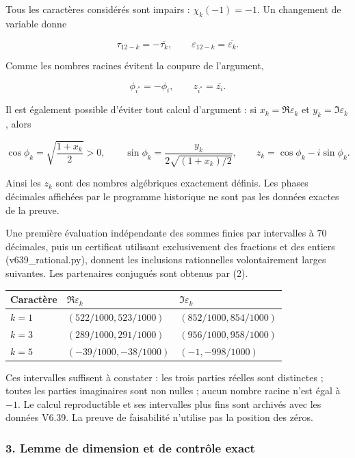 \documentclass[
  10pt,
  a4paper,
]{article}
\begin{document}
Tous les caractères considérés sont impairs : \(\chi_k(-1)=-1\). Un
changement de variable donne

\[
\tau_{12-k}=-\overline{\tau_k},\qquad
\varepsilon_{12-k}=\overline{\varepsilon_k}.
\]

Comme les nombres racines évitent la coupure de l'argument,

\[
\phi_{i^*}=-\phi_i,\qquad z_{i^*}=\overline{z_i}. \tag{2}
\]

Il est également possible d'éviter tout calcul d'argument : si
\(x_k=\Re\varepsilon_k\) et \(y_k=\Im\varepsilon_k\), alors

\[
\cos\phi_k=\sqrt{\frac{1+x_k}{2}}>0,\qquad
\sin\phi_k=\frac{y_k}{2\sqrt{(1+x_k)/2}},\qquad
z_k=\cos\phi_k-i\sin\phi_k. \tag{3}
\]

Ainsi les \(z_k\) sont des nombres algébriques exactement définis. Les
phases décimales affichées par le programme historique ne sont pas les
données exactes de la preuve.

Une première évaluation indépendante des sommes finies par intervalles à
70 décimales, puis un certificat utilisant exclusivement des fractions
et des entiers (v639\_rational.py), donnent les inclusions rationnelles
volontairement larges suivantes. Les partenaires conjugués sont obtenus
par (2).

\begin{longtable}[]{@{}lll@{}}
\toprule\noalign{}
Caractère & \(\Re\varepsilon_k\) & \(\Im\varepsilon_k\) \\
\midrule\noalign{}
\endhead
\bottomrule\noalign{}
\endlastfoot
\(k=1\) & \((522/1000,523/1000)\) & \((852/1000,854/1000)\) \\
\(k=3\) & \((289/1000,291/1000)\) & \((956/1000,958/1000)\) \\
\(k=5\) & \((-39/1000,-38/1000)\) & \((-1,-998/1000)\) \\
\end{longtable}

Ces intervalles suffisent à constater : les trois parties réelles sont
distinctes ; toutes les parties imaginaires sont non nulles ; aucun
nombre racine n'est égal à \(-1\). Le calcul reproductible et ses
intervalles plus fins sont archivés avec les données V6.39. La preuve de
faisabilité n'utilise pas la position des zéros.

\hypertarget{lemme-de-dimension-et-de-contruxf4le-exact}{%
\subsubsection{3. Lemme de dimension et de contrôle
exact}\label{lemme-de-dimension-et-de-contruxf4le-exact}}
\end{document}
